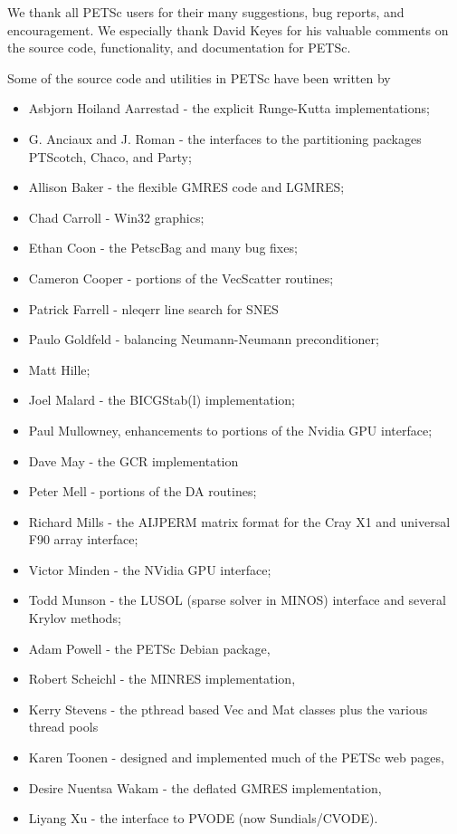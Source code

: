 %
%

\medskip \medskip \noindent
We thank all PETSc users for their many suggestions, bug reports, and
encouragement.  We especially thank David Keyes
for his valuable comments on the source code,
functionality, and documentation for PETSc.


\vspace{.3in}
\noindent
Some of the source code and utilities in PETSc
have been written by
\begin{itemize}
  \item Asbjorn Hoiland Aarrestad - the explicit Runge-Kutta implementations;
  \item G. Anciaux and J. Roman - the interfaces to the partitioning packages PTScotch, Chaco, and Party;
  \item Allison Baker - the flexible GMRES code and LGMRES;
  \item Chad Carroll - Win32 graphics;
  \item Ethan Coon - the PetscBag and many bug fixes;
  \item Cameron Cooper - portions of the VecScatter routines;
  \item Patrick Farrell - nleqerr line search for SNES
  \item Paulo Goldfeld - balancing Neumann-Neumann preconditioner;
  \item Matt Hille;
  \item Joel Malard - the BICGStab(l) implementation;
  \item Paul Mullowney, enhancements to portions of the Nvidia GPU interface;
  \item Dave May - the GCR implementation
  \item Peter Mell - portions of the DA routines;
  \item Richard Mills - the AIJPERM matrix format for the Cray X1 and universal F90 array interface;
  \item Victor Minden - the NVidia GPU interface;
  \item Todd Munson - the LUSOL (sparse solver in MINOS) interface and several Krylov methods;
  \item Adam Powell - the PETSc Debian package,
  \item Robert Scheichl - the MINRES implementation,
  \item Kerry Stevens - the pthread based Vec and Mat classes plus the various thread pools
  \item Karen Toonen - designed and implemented much of the PETSc web pages,
  \item Desire Nuentsa Wakam - the deflated GMRES implementation,
  \item Liyang Xu - the interface to PVODE (now Sundials/CVODE).
\end{itemize}

